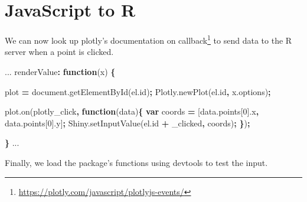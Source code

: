 \documentclass[
]{krantz}
\makeatletter
\newenvironment{Shaded}{\begin{snugshade}}{\end{snugshade}}
\newcommand{\AttributeTok}[1]{\textcolor[rgb]{0.61,0.61,0.61}{#1}}
\newcommand{\DecValTok}[1]{\textcolor[rgb]{0.06,0.06,0.06}{#1}}
\newcommand{\KeywordTok}[1]{\textcolor[rgb]{0.27,0.27,0.27}{\textbf{#1}}}
\newcommand{\NormalTok}[1]{#1}
\newcommand{\OperatorTok}[1]{\textcolor[rgb]{0.43,0.43,0.43}{\textbf{#1}}}
\newcommand{\StringTok}[1]{\textcolor[rgb]{0.5,0.5,0.5}{#1}}
\newcommand{\VariableTok}[1]{\textcolor[rgb]{0,0,0}{#1}}
\renewcommand{\href}[2]{#2\footnote{\url{#1}}}
\newenvironment{kframe}{%
\medskip{}
\setlength{\fboxsep}{.8em}
 \def\at@end@of@kframe{}%
 \ifinner\ifhmode%
  \def\at@end@of@kframe{\end{minipage}}%
  \begin{minipage}{\columnwidth}%
 \fi\fi%
 \def\FrameCommand##1{\hskip\@totalleftmargin \hskip-\fboxsep
 \colorbox{shadecolor}{##1}\hskip-\fboxsep
     \hskip-\linewidth \hskip-\@totalleftmargin \hskip\columnwidth}%
 \MakeFramed {\advance\hsize-\width
   \@totalleftmargin\z@ \linewidth\hsize
   \@setminipage}}%
 {\par\unskip\endMakeFramed%
 \at@end@of@kframe}
\renewenvironment{Shaded}{\begin{kframe}}{\end{kframe}}
\makeatother
\begin{document}
\hypertarget{javascript-to-r}{%
\section{JavaScript to R}\label{javascript-to-r}}

We can now look up plotly's documentation on \href{https://plotly.com/javascript/plotlyjs-events/}{callback} to send data to the R server when a point is clicked.

\begin{Shaded}
\begin{Highlighting}[]
\NormalTok{...}
\NormalTok{renderValue}\OperatorTok{:} \KeywordTok{function}\NormalTok{(x) }\OperatorTok{\{}

\NormalTok{  plot }\OperatorTok{=} \VariableTok{document}\NormalTok{.}\AttributeTok{getElementById}\NormalTok{(}\VariableTok{el}\NormalTok{.}\AttributeTok{id}\NormalTok{)}\OperatorTok{;}
  \VariableTok{Plotly}\NormalTok{.}\AttributeTok{newPlot}\NormalTok{(}\VariableTok{el}\NormalTok{.}\AttributeTok{id}\OperatorTok{,} \VariableTok{x}\NormalTok{.}\AttributeTok{options}\NormalTok{)}\OperatorTok{;}

  \VariableTok{plot}\NormalTok{.}\AttributeTok{on}\NormalTok{(}\StringTok{\textquotesingle{}plotly\_click\textquotesingle{}}\OperatorTok{,} \KeywordTok{function}\NormalTok{(data)}\OperatorTok{\{}
    \KeywordTok{var}\NormalTok{ coords }\OperatorTok{=}\NormalTok{ [}\VariableTok{data}\NormalTok{.}\AttributeTok{points}\NormalTok{[}\DecValTok{0}\NormalTok{].}\AttributeTok{x}\OperatorTok{,} \VariableTok{data}\NormalTok{.}\AttributeTok{points}\NormalTok{[}\DecValTok{0}\NormalTok{].}\AttributeTok{y}\NormalTok{]}\OperatorTok{;}
    \VariableTok{Shiny}\NormalTok{.}\AttributeTok{setInputValue}\NormalTok{(}\VariableTok{el}\NormalTok{.}\AttributeTok{id} \OperatorTok{+} \StringTok{\textquotesingle{}\_clicked\textquotesingle{}}\OperatorTok{,}\NormalTok{ coords)}\OperatorTok{;}
  \OperatorTok{\}}\NormalTok{)}\OperatorTok{;}

\OperatorTok{\}}
\NormalTok{...}
\end{Highlighting}
\end{Shaded}

Finally, we load the package's functions using devtools to test the input.
\end{document}
